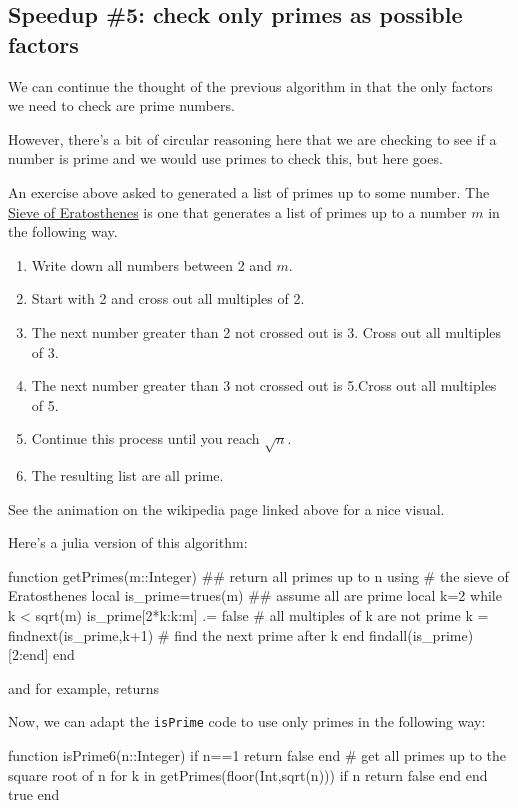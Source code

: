	
\subsection{Speedup \#5: check only primes as possible factors}

We can continue the thought of the previous algorithm in that the only factors we need to check are prime numbers.  

However, there's a bit of circular reasoning here that we are checking to see if a number is prime and we would use primes to check this, but here goes.  

An exercise above asked to generated a list of primes up to some number.  The \href{https://en.wikipedia.org/wiki/Sieve_of_Eratosthenes}{Sieve of Eratosthenes} is one that generates a list of primes up to a number $m$ in the following way. 
\begin{enumerate}
\item Write down all numbers between 2 and $m$.
\item Start with 2 and cross out all multiples of 2.
\item The next number greater than 2 not crossed out is 3. Cross out all multiples of 3.
\item The next number greater than 3 not crossed out is 5.Cross out all multiples of 5. 
\item Continue this process until you reach $\sqrt{n}$. 
\item The resulting list are all prime. 
\end{enumerate}

See the animation on the wikipedia page linked above for a nice visual.  

Here's a julia version of this algorithm:
\begin{jlblock}[nt][numbers=left]
function getPrimes(m::Integer) ## return all primes up to n using 
  # the sieve of Eratosthenes
  local is_prime=trues(m) ## assume all are prime
  local k=2
  while k < sqrt(m)
    is_prime[2*k:k:m] .= false # all multiples of k are not prime
    k = findnext(is_prime,k+1) # find the next prime after k
  end
  findall(is_prime)[2:end]
end
\end{jlblock}
and for example,  returns
\printpythontex[verbatim]

Now, we can adapt the \verb!isPrime! code to use only primes in the following way:
\begin{jlblock}[nt]
function isPrime6(n::Integer)
  if n==1
    return false
  end
  # get all primes up to the square root of n
  for k in getPrimes(floor(Int,sqrt(n))) 
    if n%
      return false
    end
  end
  true
end
\end{jlblock}

